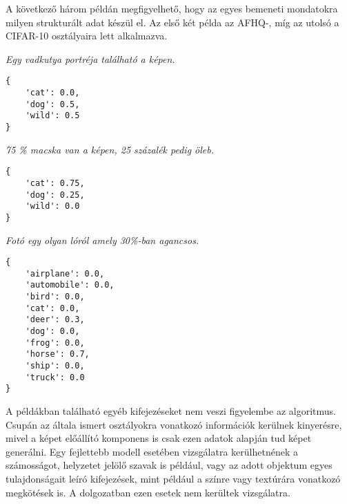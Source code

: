 A következő három példán megfigyelhető, hogy az egyes bemeneti mondatokra milyen strukturált adat készül el. Az első két példa az AFHQ-, míg az utolsó a CIFAR-10 osztályaira lett alkalmazva.

\noindent\textit{Egy vadkutya portréja található a képen.}
\small{
\begin{verbatim}
{
    'cat': 0.0,
    'dog': 0.5,
    'wild': 0.5
}
\end{verbatim}
}

\noindent\textit{75 \% macska van a képen, 25 százalék pedig öleb.}
\small{
\begin{verbatim}
{
    'cat': 0.75,
    'dog': 0.25,
    'wild': 0.0
}
\end{verbatim}
}

\noindent\textit{Fotó egy olyan lóról amely 30\%-ban agancsos.}
\small{
\begin{verbatim}
{
    'airplane': 0.0,
    'automobile': 0.0,
    'bird': 0.0,
    'cat': 0.0,
    'deer': 0.3,
    'dog': 0.0,
    'frog': 0.0,
    'horse': 0.7,
    'ship': 0.0,
    'truck': 0.0
}
\end{verbatim}
}

A példákban található egyéb kifejezéseket nem veszi figyelembe az algoritmus. Csupán az általa ismert osztályokra vonatkozó információk kerülnek kinyerésre, mivel a képet előállító komponens is csak ezen adatok alapján tud képet generálni. Egy fejlettebb modell esetében vizsgálatra kerülhetnének a számosságot, helyzetet jelölő szavak is például, vagy az adott objektum egyes tulajdonságait leíró kifejezések, mint például a színre vagy textúrára vonatkozó megkötések is. A dolgozatban ezen esetek nem kerültek vizsgálatra.
